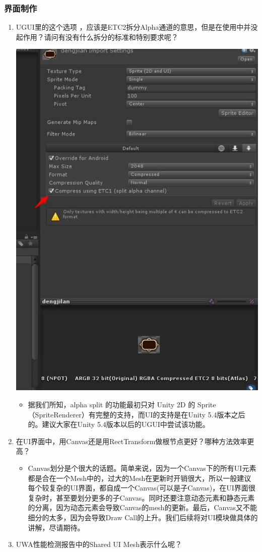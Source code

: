 \documentclass[9pt, b5paper]{article}
\begin{document}
\subsubsection{界面制作}
\label{sec:orgaf3e46f}
\begin{enumerate}
\item UGUI里的这个选项 ，应该是ETC2拆分Alpha通道的意思，但是在使用中并没起作用？请问有没有什么拆分的标准和特别要求呢？
\label{sec:org507a082}

\begin{center}
\includegraphics[width=.9\linewidth]{./pic/ugui1.jpg}
\end{center}
\begin{itemize}
\item 据我们所知，alpha split 的功能最初只对 Unity 2D 的 Sprite（SpriteRenderer）有完整的支持，而UI的支持是在Unity 5.4版本之后的。建议大家在Unity 5.4版本以后的UGUI中尝试该功能。
\end{itemize}
\item 在UI界面中，用Canvas还是用RectTransform做根节点更好？哪种方法效率更高？
\label{sec:orgc68317b}
\begin{itemize}
\item Canvas划分是个很大的话题。简单来说，因为一个Canvas下的所有UI元素都是合在一个Mesh中的，过大的Mesh在更新时开销很大，所以一般建议每个较复杂的UI界面，都自成一个Canvas(可以是子Canvas)，在UI界面很复杂时，甚至要划分更多的子Canvas。同时还要注意动态元素和静态元素的分离，因为动态元素会导致Canvas的mesh的更新。最后，Canvas又不能细分的太多，因为会导致Draw Call的上升。我们后续将对UI模块做具体的讲解，尽请期待。
\end{itemize}
\item UWA性能检测报告中的Shared UI Mesh表示什么呢？
\label{sec:orgc4ee66e}


\end{enumerate}
\end{document}
